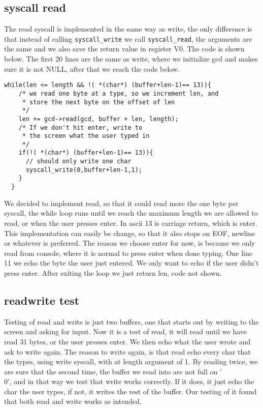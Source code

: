 \documentclass[11pt]{article}
\begin{document}
\subsection{syscall read}
The read syscall is implemented in the same way as write, the only difference is that instead of calling \verb|syscall_write| we call \verb|syscall_read|, the arguments are the same and we also save the return value in register V0. The code is shown below.
The first 20 lines are the same as write, where we initialize gcd and makes sure it is not NULL, after that we reach the code below. 
\begin{lstlisting}
while(len <= length && !( *(char*) (buffer+len-1)== 13)){
    /* we read one byte at a type, so we increment len, and
     * store the next byte on the offset of len
     */
    len += gcd->read(gcd, buffer + len, length);
    /* If we don't hit enter, write to
     * the screen what the user typed in
     */
    if(!( *(char*) (buffer+len-1)== 13)){
      // should only write one char
      syscall_write(0,buffer+len-1,1);
    }
  }
\end{lstlisting}
We decided to implement read, so that it could read more the one byte per syscall, the while loop runs until we reach the maximum length we are allowed to read, or when the user presses enter. In ascii 13 is carriage return, which is enter. This implementation can easily be change, so that it also stops on EOF, newline or whatever is preferred. The reason we choose enter for now, is because we only read from console, where it is normal to press enter when done typing. One line 11 we echo the byte the user just entered. We only want to echo if the user didn't press enter. After exiting the loop we just return len, code not shown.

\subsection{readwrite test}
Testing of read and write is just two buffers, one that starts out by writing to the screen and asking for input. Now it is a test of read, it will read until we have read 31 bytes, or the user presses enter. We then echo what the user wrote and ask to write again. The reason to write again, is that read echo every char that the  types, using write syscall, with at length argument of 1. By reading twice, we are sure that the second time, the buffer we read into are not full on '\\0', and in that way we test that write works correctly. If it does, it just echo the char the user types, if not, it writes the  rest of the buffer. Our testing of it found that both read and write works as intended.
\end{document}
